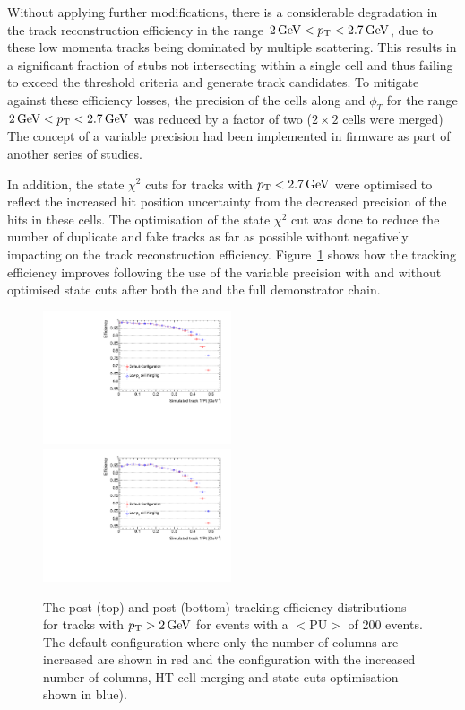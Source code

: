 Without applying further modifications, there is a considerable degradation in the track reconstruction efficiency in the range $2\,\text{Ge\hspace{-.08em}V} < p_{\mathrm{T}} < 2.7\,\text{Ge\hspace{-.08em}V}$, due to these low momenta tracks being dominated by multiple scattering.
This results in a significant fraction of stubs not intersecting within a single \HT cell and thus failing to exceed the threshold criteria and generate track candidates.
To mitigate against these efficiency losses, the precision of the \HT cells along \qpt and $\phi_{T}$ for the range $2\,\text{Ge\hspace{-.08em}V} < p_{\mathrm{T}} < 2.7\,\text{Ge\hspace{-.08em}V}$ was reduced by a factor of two (\ie $2 \times 2$ cells were merged)
The concept of a variable precision \HT had been implemented in firmware as part of another series of studies.

In addition, the \KF state $\chi^2$ cuts for tracks with $p_{\mathrm{T}} < 2.7\,\text{Ge\hspace{-.08em}V}$ were optimised to reflect the increased hit position uncertainty from the decreased precision of the hits in these \HT cells.
The optimisation of the \KF state $\chi^2$ cut was done to reduce the number of duplicate and fake tracks as far as possible without negatively impacting on the \HT track reconstruction efficiency.
Figure~\ref{fig:2GeVFlatEff} shows how the tracking efficiency improves following the use of the variable precision \HT with and without optimised \KF state cuts after both the \HT and the full demonstrator chain. 

\begin{figure}[htb]
\centering
\includegraphics[width=0.495\textwidth]{figs/tk-upgrade/results-lowPtTracking/htTrackingEffVsInvPtFlatGeometry_5000.pdf}
\includegraphics[width=0.495\textwidth]{figs/tk-upgrade/results-lowPtTracking/kfTrackingEffVsInvPtFlatGeometry_5000.pdf}
\caption{The post-\HT (top) and post-\KF (bottom) tracking efficiency distributions for tracks with $p_{\mathrm{T}} > 2\,\text{Ge\hspace{-.08em}V}$ for \ttbar events with a $<\textrm{PU}>$ of 200 events. The default configuration where only the number of \qpt columns are increased are shown in red and the configuration with the increased number of columns, HT cell merging and \KF state cuts optimisation shown in blue).
}
\label{fig:2GeVFlatEff}	
\end{figure}

